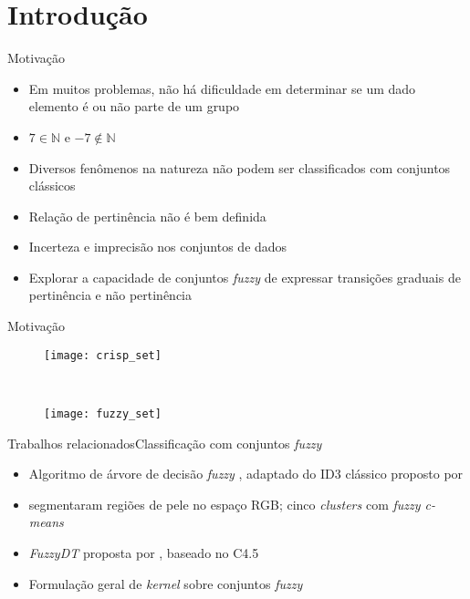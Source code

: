 \section{Introdução}

\begin{frame}{Motivação}
\begin{itemize}
    \item Em muitos problemas, não há dificuldade em determinar se um dado elemento é ou não parte de um grupo
    \item $7 \in \mathbb{N}$ e $-7 \notin \mathbb{N}$
    \item Diversos fenômenos na natureza não podem ser classificados com conjuntos clássicos
    \item Relação de pertinência não é bem definida \citep{pedrycz:98}
    \item Incerteza e imprecisão nos conjuntos de dados
    \item Explorar a capacidade de conjuntos \emph{fuzzy} de expressar transições graduais de pertinência e não pertinência
\end{itemize}
\end{frame}

\begin{frame}{Motivação}
\begin{figure}[h]
    \centering
    \begin{minipage}{0.48\textwidth}
        \texttt{[image: crisp\_set]}
    \end{minipage}
    ~ %
    \begin{minipage}{0.48\textwidth}
        \texttt{[image: fuzzy\_set]}
    \end{minipage}
\end{figure}
\end{frame}

\begin{frame}{Trabalhos relacionados}{Classificação com conjuntos \emph{fuzzy}}
\begin{itemize}
    \item Algoritmo de árvore de decisão \emph{fuzzy} \citep{umano:94}, adaptado do ID3 clássico proposto por \citet{quinlan:86}
    \item \citet{bhatt:09} segmentaram regiões de pele no espaço RGB; cinco \emph{clusters} com \emph{fuzzy c-means} \citep{bezdek:84}
    \item \emph{FuzzyDT} proposta por \citet{cintra:13}, baseado no C4.5 \citep{quinlan:93}
    \item Formulação geral de \emph{kernel} sobre conjuntos \emph{fuzzy} \citep{guevara:14}
\end{itemize}
\end{frame}

